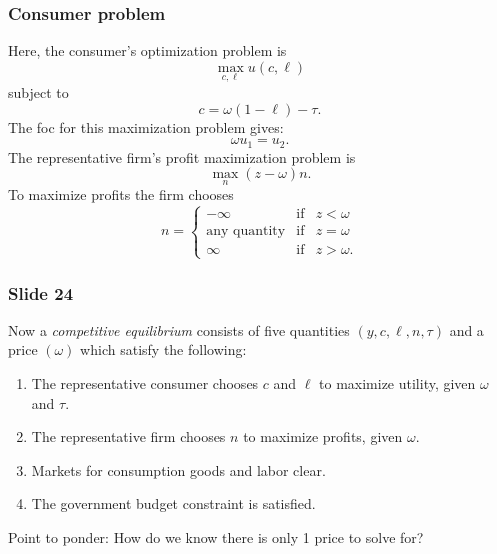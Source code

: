 \documentclass[aspectratio=169]{ltx-talk}
\begin{document}
\begin{frame}
\frametitle{Consumer problem}
Here, the consumer's optimization problem is%
\begin{equation*}
\underset{c,\ell }{\max }u\left( c,\ell \right)
\end{equation*}%
subject to%
\begin{equation*}
c=\omega (1-\ell )-\tau .
\end{equation*}%
The foc for this maximization problem gives:%
\begin{equation*}
\omega u_{1}=u_{2}.
\end{equation*}%
The representative firm's profit maximization problem is%
\begin{equation*}
\underset{n}{\max }\left( z-\omega \right) n.
\end{equation*}%
To maximize profits the firm chooses 
\begin{equation*}
n=\left\{ 
\begin{array}{ccc}
-\infty & \text{if} & z<\omega \\ 
\text{any quantity} & \text{if} & z=\omega \\ 
\infty & \text{if} & z>\omega .%
\end{array}%
\right.
\end{equation*}%
\end{frame}

\begin{frame}
\frametitle{Slide 24}
Now a \textit{competitive equilibrium} consists of five quantities $\left(
y,c,\ell ,n,\tau \right) $ and a price $\left( \omega \right) $ which
satisfy the following:

\begin{enumerate}
\item The representative consumer chooses $c$ and $\ell $ to maximize
utility, given $\omega $ and $\tau $.

\item The representative firm chooses $n$ to maximize profits, given $\omega 
$.

\item Markets for consumption goods and labor clear.

\item The government budget constraint is satisfied.
\end{enumerate}

Point to ponder: How do we know there is only 1 price to solve for?
\end{frame}
\end{document}
